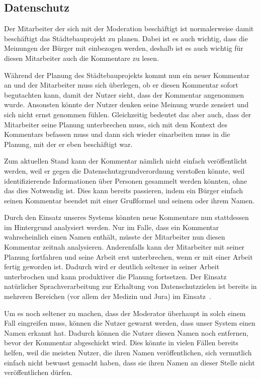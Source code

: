 \documentclass[runningheads]{llncs}
\begin{document}
	\subsection{Datenschutz}
		Der Mitarbeiter der sich mit der Moderation beschäftigt ist normalerweise damit beschäftigt das Städtebauprojekt zu planen.
		Dabei ist es auch wichtig, dass die Meinungen der Bürger mit einbezogen werden, deshalb ist es auch wichtig für diesen Mitarbeiter auch die Kommentare zu lesen.
		
		Während der Planung des Städtebauprojekts kommt nun ein neuer Kommentar an und der Mitarbeiter muss sich überlegen, ob er diesen Kommentar sofort begutachten kann, damit der Nutzer sieht, dass der Kommentar angenommen wurde.
		Ansonsten könnte der Nutzer denken seine Meinung wurde zensiert und sich nicht ernst genommen fühlen.
		Gleichzeitig bedeutet das aber auch, dass der Mitarbeiter seine Planung unterbrechen muss, sich mit dem Kontext des Kommentars befassen muss und dann sich wieder einarbeiten muss in die Planung, mit der er eben beschäftigt war.
		
		Zum aktuellen Stand kann der Kommentar nämlich nicht einfach veröffentlicht werden, weil er gegen die Datenschutzgrundverordnung verstoßen könnte, weil identifizierende Informationen über Personen gesammelt werden könnten, ohne das dies Notwendig ist. 
		Dies kann bereits passieren, indem ein Bürger einfach seinen Kommentar beendet mit einer Grußformel und seinem oder ihrem Namen.
		
		Durch den Einsatz unseres Systems könnten neue Kommentare nun stattdessen im Hintergrund analysiert werden.
		Nur im Falle, dass ein Kommentar wahrscheinlich einen Namen enthält, müsste der Mitarbeiter nun diesen Kommentar zeitnah analysieren.
		Anderenfalls kann der Mitarbeiter mit seiner Planung fortfahren und seine Arbeit erst unterbrechen, wenn er mit einer Arbeit fertig geworden ist.
		Dadurch wird er deutlich seltener in seiner Arbeit unterbrochen und kann produktiver die Planung fortsetzen.
		Der Einsatz natürlicher Sprachverarbeitung zur Erhaltung von Datenschutzzielen ist bereits in mehreren Bereichen (vor allem der Medizin und Jura) im Einsatz~\cite{sadat2019privacy}.
		
		Um es noch seltener zu machen, dass der Moderator überhaupt in solch einem Fall eingreifen muss, können die Nutzer gewarnt werden, dass unser System einen Namen erkannt hat.
		Dadurch können die Nutzer diesen Namen noch entfernen, bevor der Kommentar abgeschickt wird.
		Dies könnte in vielen Fällen bereits helfen, weil die meisten Nutzer, die ihren Namen veröffentlichen, sich vermutlich einfach nicht bewusst gemacht haben, dass sie ihren Namen an dieser Stelle nicht veröffentlichen dürfen.
		
\end{document}
